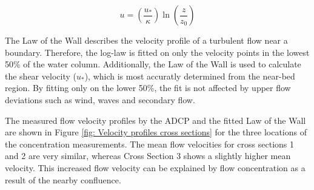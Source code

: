 \begin{equation}
    u = \left( \frac{u_*}{\kappa} \right) \ln\left( \frac{z}{z_0} \right)
    \label{eq:law_of_the_wall}
\end{equation}

The Law of the Wall describes the velocity profile of a turbulent flow near a boundary. Therefore, the log-law is fitted on only the velocity points in the lowest 50\% of the water column. Additionally, the Law of the Wall is used to calculate the shear velocity ($u_*$), which is most accuratly determined from the near-bed region. By fitting only on the lower 50\%, the fit is not affected by upper flow deviations such as wind, waves and secondary flow. 

The measured flow velocity profiles by the ADCP and the fitted Law of the Wall are shown in Figure \ref{fig: Velocity profiles cross sections} for the three locations of the concentration measurements. The mean flow velocities for cross sections 1 and 2 are very similar, whereas Cross Section 3 shows a slightly higher mean velocity. This increased flow velocity can be explained by flow concentration as a result of the nearby confluence.

